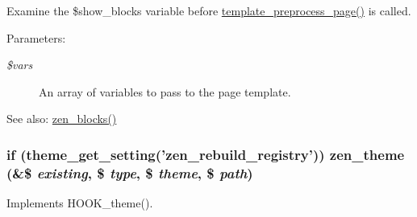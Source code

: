 Examine the \$show\_\-blocks variable before \hyperlink{includes_2theme_8inc_128dae24f990d8ba4710ac78b0584c11}{template\_\-preprocess\_\-page()} is called.

\begin{Desc}
\item[Parameters:]
\begin{description}
\item[{\em \$vars}]An array of variables to pass to the page template.\end{description}
\end{Desc}
\begin{Desc}
\item[See also:]\hyperlink{sites_2all_2themes_2zen_2template_8php_5d93a4bc56049bf6962fa956bc54d274}{zen\_\-blocks()} \end{Desc}
\hypertarget{sites_2all_2themes_2zen_2template_8php_aedb086736f6fb568846dddaaa420ba0}{
\subsubsection[{zen\_\-theme}]{\setlength{\rightskip}{0pt plus 5cm}if (theme\_\-get\_\-setting('zen\_\-rebuild\_\-registry')) zen\_\-theme (\&\$ {\em existing}, \/  \$ {\em type}, \/  \$ {\em theme}, \/  \$ {\em path})}}
\label{sites_2all_2themes_2zen_2template_8php_aedb086736f6fb568846dddaaa420ba0}


Implements HOOK\_\-theme(). 